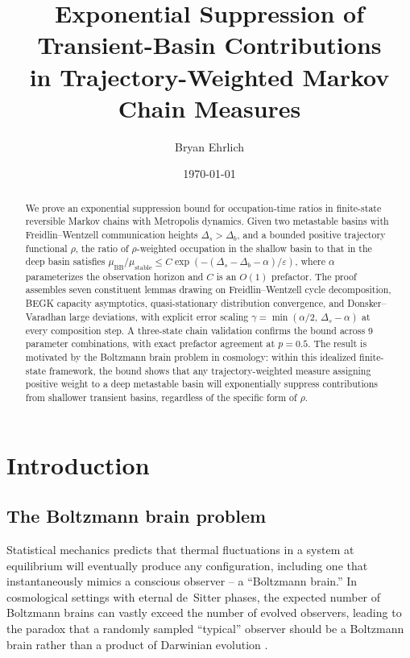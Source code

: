 \documentclass[11pt]{article}
\title{Exponential Suppression of Transient-Basin Contributions\\
in Trajectory-Weighted Markov Chain Measures}
\author{Bryan Ehrlich}
\date{\today}
\newcommand{\Ds}{\Delta_s}
\begin{document}
\maketitle

\begin{abstract}
We prove an exponential suppression bound for occupation-time ratios
in finite-state reversible Markov chains with Metropolis dynamics.
Given two metastable basins with Freidlin--Wentzell communication
heights $\Delta_s > \Delta_b$, and a bounded positive trajectory
functional $\rho$, the ratio of $\rho$-weighted occupation in the
shallow basin to that in the deep basin satisfies
$\mu_{\mathrm{BB}} / \mu_{\mathrm{stable}} \leq C \exp(-(\Delta_s -
\Delta_b - \alpha)/\varepsilon)$, where $\alpha$ parameterizes the
observation horizon and $C$ is an $O(1)$ prefactor.  The proof
assembles seven constituent lemmas drawing on Freidlin--Wentzell cycle
decomposition, BEGK capacity asymptotics, quasi-stationary
distribution convergence, and Donsker--Varadhan large deviations, with
explicit error scaling $\gamma = \min(\alpha/2,\, \Ds - \alpha)$ at
every composition step.  A three-state chain validation confirms the
bound across 9 parameter combinations, with exact prefactor agreement
at $p = 0.5$.  The result is motivated by the Boltzmann brain problem
in cosmology: within this idealized finite-state framework, the bound
shows that any trajectory-weighted measure assigning positive weight
to a deep metastable basin will exponentially suppress contributions
from shallower transient basins, regardless of the specific form
of $\rho$.
\end{abstract}

\section{Introduction}
\label{sec:intro}

\subsection{The Boltzmann brain problem}

Statistical mechanics predicts that thermal fluctuations in a system
at equilibrium will eventually produce any configuration, including
one that instantaneously mimics a conscious observer -- a ``Boltzmann
brain.''  In cosmological settings with eternal de~Sitter phases, the
expected number of Boltzmann brains can vastly exceed the number of
evolved observers, leading to the paradox that a randomly sampled
``typical'' observer should be a Boltzmann brain rather than a
product of Darwinian evolution
\cite{AlbrechtSorbo2004,Page2006,BoussoFreivogel2007,DKS2002}.
\end{document}
